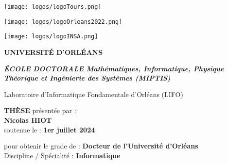 \thispagestyle{empty}

{\setlength{\parindent}{0cm}

\begin{sffamily}

\begin{minipage}{1cm}
\texttt{[image: logos/logoTours.png]} 
\end{minipage}
\hfill
\begin{minipage}{1cm}
\texttt{[image: logos/logoOrleans2022.png]} 
\end{minipage}
\hfill
\begin{minipage}{3cm}
\texttt{[image: logos/logoINSA.png]} 
\end{minipage}

\vspace{0.5cm}
\begin{minipage}{15.5cm}
\centering
\LARGE\textbf{UNIVERSITÉ D'ORLÉANS}
\end{minipage}
\hfill

\vspace{0.3cm}

\begin{minipage}{\textwidth}
\centering
\Large\textit{\textbf{ÉCOLE DOCTORALE Mathématiques, Informatique, Physique Théorique et Ingénierie des Systèmes (MIPTIS)}}

Laboratoire d'Informatique Fondamentale d'Orléans (LIFO)
\end{minipage}

\vspace{0.3cm}

\begin{minipage}{\textwidth}
\centering\LARGE
\textbf{THÈSE} \normalsize présentée par : \\
\vspace{0.3cm}
\LARGE\textbf{Nicolas HIOT}\\
\vspace{0.3cm}
soutenue le : \textbf{1er juillet 2024}
\end{minipage}
	
\vspace{0.3cm}
	
\begin{minipage}{\textwidth}
\centering\large
pour obtenir le grade de : \textbf{Docteur de l'Université d'Orléans \\ \vspace{0.3cm}}
Discipline / Spécialité : \textbf{Informatique}
\end{minipage}
	

\end{sffamily}}
